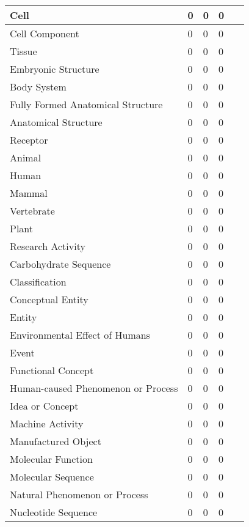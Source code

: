 \documentclass[10.7pt,]{article}
\begin{document}
\begin{longtable}{|l|p{0.3cm}|p{0.3cm}|p{0.3cm}|p{7.9cm}|}
        Cell & 0 & 0 & 0 & ~ \\ \hline
        Cell Component & 0 & 0 & 0 & ~ \\ \hline
        Tissue & 0 & 0 & 0 & ~ \\ \hline
        Embryonic Structure & 0 & 0 & 0 & ~ \\ \hline
        Body System & 0 & 0 & 0 & ~ \\ \hline
        Fully Formed Anatomical Structure & 0 & 0 & 0 & ~ \\ \hline
        Anatomical Structure & 0 & 0 & 0 & ~ \\ \hline
        Receptor & 0 & 0 & 0 & ~ \\ \hline
        Animal & 0 & 0 & 0 & ~ \\ \hline
        Human & 0 & 0 & 0 & ~ \\ \hline
        Mammal & 0 & 0 & 0 & ~ \\ \hline
        Vertebrate & 0 & 0 & 0 & ~ \\ \hline
        Plant & 0 & 0 & 0 & ~ \\ \hline
        Research Activity & 0 & 0 & 0 & ~ \\ \hline
        Carbohydrate Sequence & 0 & 0 & 0 & ~ \\ \hline
        Classification & 0 & 0 & 0 & ~ \\ \hline
        Conceptual Entity & 0 & 0 & 0 & ~ \\ \hline
        Entity & 0 & 0 & 0 & ~ \\ \hline
        Environmental Effect of Humans & 0 & 0 & 0 & ~ \\ \hline
        Event & 0 & 0 & 0 & ~ \\ \hline
        Functional Concept & 0 & 0 & 0 & ~ \\ \hline
        Human-caused Phenomenon or Process & 0 & 0 & 0 & ~ \\ \hline
        Idea or Concept & 0 & 0 & 0 & ~ \\ \hline
        Machine Activity & 0 & 0 & 0 & ~ \\ \hline
        Manufactured Object & 0 & 0 & 0 & ~ \\ \hline
        Molecular Function & 0 & 0 & 0 & ~ \\ \hline
        Molecular Sequence & 0 & 0 & 0 & ~ \\ \hline
        Natural Phenomenon or Process & 0 & 0 & 0 & ~ \\ \hline
        Nucleotide Sequence & 0 & 0 & 0 & ~ \\ \hline

\end{longtable}
\end{document}
